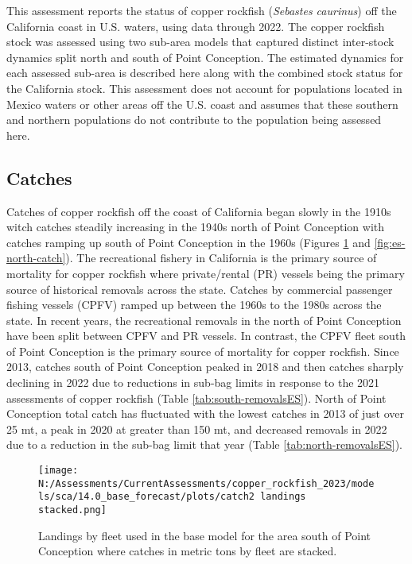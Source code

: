 \documentclass[11pt,
  english,
  letterpaper,
]{article}
\begin{document}
This assessment reports the status of copper rockfish (\emph{Sebastes caurinus}) off the California coast in U.S. waters, using data through 2022. The copper rockfish stock was assessed using two sub-area models that captured distinct inter-stock dynamics split north and south of Point Conception. The estimated dynamics for each assessed sub-area is described here along with the combined stock status for the California stock. This assessment does not account for populations located in Mexico waters or other areas off the U.S. coast and assumes that these southern and northern populations do not contribute to the population being assessed here.

\hypertarget{catches}{%
\subsection*{Catches}\label{catches}}

Catches of copper rockfish off the coast of California began slowly in the 1910s witch catches steadily increasing in the 1940s north of Point Conception with catches ramping up south of Point Conception in the 1960s (Figures \ref{fig:es-south-catch} and \ref{fig:es-north-catch}). The recreational fishery in California is the primary source of mortality for copper rockfish where private/rental (PR) vessels being the primary source of historical removals across the state. Catches by commercial passenger fishing vessels (CPFV) ramped up between the 1960s to the 1980s across the state. In recent years, the recreational removals in the north of Point Conception have been split between CPFV and PR vessels. In contrast, the CPFV fleet south of Point Conception is the primary source of mortality for copper rockfish. Since 2013, catches south of Point Conception peaked in 2018 and then catches sharply declining in 2022 due to reductions in sub-bag limits in response to the 2021 assessments of copper rockfish (Table \ref{tab:south-removalsES}). North of Point Conception total catch has fluctuated with the lowest catches in 2013 of just over 25 mt, a peak in 2020 at greater than 150 mt, and decreased removals in 2022 due to a reduction in the sub-bag limit that year (Table \ref{tab:north-removalsES}).





\begin{figure}
\centering
\texttt{[image: N:/Assessments/CurrentAssessments/copper\_rockfish\_2023/models/sca/14.0\_base\_forecast/plots/catch2 landings stacked.png]}
\caption{Landings by fleet used in the base model for the area south of Point Conception where catches in metric tons by fleet are stacked.\label{fig:es-south-catch}}
\end{figure}
\end{document}
